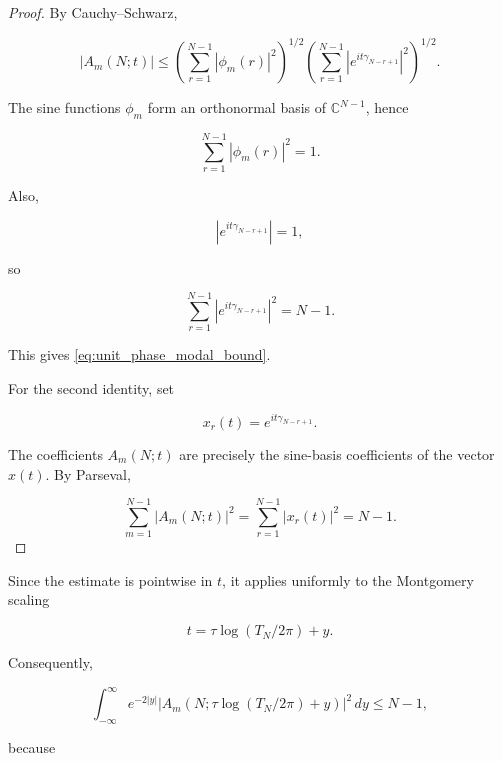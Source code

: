 \documentclass[11pt]{amsart}
\numberwithin{equation}{section}
\theoremstyle{plain}
\theoremstyle{definition}
\theoremstyle{remark}
\begin{document}
\begin{proof}
By Cauchy--Schwarz,

\begin{equation}
|A_m(N;t)|
\le
\left(
\sum_{r=1}^{N-1}|\phi_m(r)|^2
\right)^{1/2}
\left(
\sum_{r=1}^{N-1}|e^{it\gamma_{N-r+1}}|^2
\right)^{1/2}.
\end{equation}

The sine functions \(\phi_m\) form an orthonormal basis of
\(\mathbb C^{N-1}\), hence

\begin{equation}
\sum_{r=1}^{N-1}|\phi_m(r)|^2=1.
\end{equation}

Also,

\begin{equation}
|e^{it\gamma_{N-r+1}}|=1,
\end{equation}

so

\begin{equation}
\sum_{r=1}^{N-1}|e^{it\gamma_{N-r+1}}|^2=N-1.
\end{equation}

This gives \eqref{eq:unit_phase_modal_bound}.

For the second identity, set

\begin{equation}
x_r(t)=e^{it\gamma_{N-r+1}}.
\end{equation}

The coefficients \(A_m(N;t)\) are precisely the sine-basis coefficients
of the vector \(x(t)\). By Parseval,

\begin{equation}
\sum_{m=1}^{N-1}|A_m(N;t)|^2
=
\sum_{r=1}^{N-1}|x_r(t)|^2
=
N-1.
\end{equation}
\end{proof}

Since the estimate is pointwise in \(t\), it applies uniformly to the
Montgomery scaling

\begin{equation}
t=\tau\log(T_N/2\pi)+y.
\end{equation}

Consequently,

\begin{equation}
\int_{-\infty}^{\infty}
e^{-2|y|}
|A_m(N;\tau\log(T_N/2\pi)+y)|^2\,dy
\le
N-1,
\label{eq:modal_weighted_y_integral_bound}
\end{equation}

because
\end{document}
